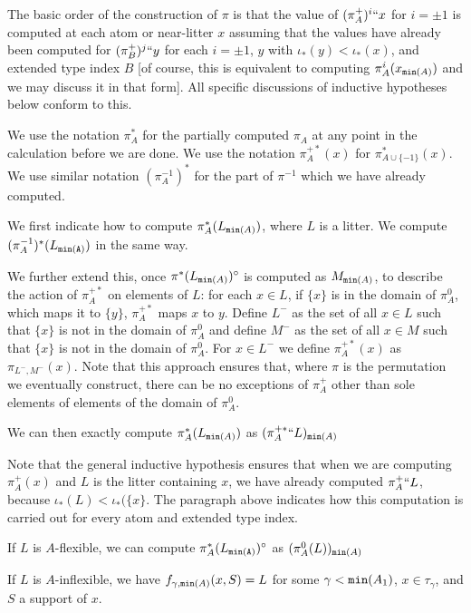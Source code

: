 \documentclass[112pt]{article}
\begin{document}
\begin{description}
The basic order of the construction of $\pi$ is that the value of $(\pi^+_A)^i``x$ for $i=\pm 1$ is computed at each atom or near-litter $x$ assuming that the values have already been computed for $(\pi^+_B)^j``y$ for each $i = \pm1$, $y$ with $\iota_*(y)<\iota_*(x)$, and extended type index $B$ [of course, this is equivalent to computing
$\pi_A^i(x_{{\tt min}(A)})$ and we may discuss it in that form].  All specific discussions of inductive hypotheses below conform to this.

We use the notation $\pi^*_A$ for the partially computed $\pi_A$ at any point in the calculation before we are done. 
We use the notation $\pi^{+*}_A(x)$ for $\pi^*_{A \cup \{-1\}}(x)$.
 We use similar notation $(\pi^{-1}_A)^*$ for the part of $\pi^{-1}$ which we have already computed.

We first indicate how to compute $\pi^*_A(L_{{\tt min}(A)})$, where $L$ is a litter.  We compute  $(\pi^{-1}_A)^*(L_{\tt min(A)})$ in the same way.

We further extend this, once $\pi^*(L_{{\tt min}(A)})^\circ$ is computed as $M_{{\tt min}(A)}$, to describe the action of $\pi^{+*}_A$ on elements of $L$:
for each $x \in L$, if $\{x\}$ is in the domain of $\pi^0_A$, which maps it to $\{y\}$, $\pi^{+*}_{A}$ maps $x$ to $y$.  Define $L^-$ as the set of all $x \in L$ such that
$\{x\}$ is not in the domain of $\pi^0_A$ and define $M^-$ as the set of all $x \in M$ such that
$\{x\}$ is not in the domain of $\pi^0_A$.  For $x \in L^-$ we define $\pi^{+*}_{A}(x)$ as $\pi_{L^-,M^-}(x)$.  Note that this approach ensures that, where $\pi$ is the permutation we eventually construct, there can be no exceptions of $\pi^+_A$ other than sole elements of elements of the domain of $\pi^0_A$.

We can then exactly compute $\pi^*_A(L_{{\tt min}(A)})$ as $(\pi^{+*}_A``L)_{{\tt min}(A)}$

Note that the general inductive hypothesis ensures that when we are computing $\pi_A^+(x)$ and $L$ is the litter containing $x$, we have already computed
$\pi^+_A``L$, because $\iota_*(L) < \iota_*(\{x\}$.  The paragraph above indicates how this computation is carried out for every atom and extended type index.

If $L$ is $A$-flexible, we can compute $\pi^*_A(L_{\tt {\tt min}(A)})^\circ$ as $(\pi^0_A(L))_{{\tt min}(A)}$

If $L$ is $A$-inflexible, we have $f_{\gamma,{\tt min}(A)}(x,S) = L$ for some $\gamma<{\tt min}(A_1)$, $x \in \tau_\gamma$, and $S$ a support of $x$.


\end{description}
\end{document}
